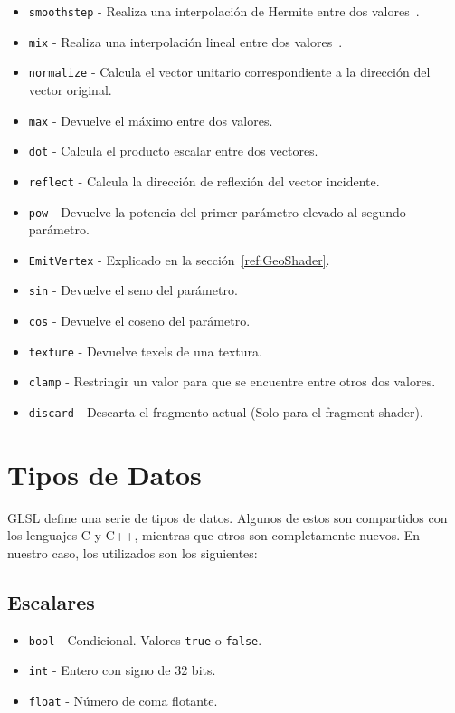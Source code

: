 \begin{itemize}
		\item \verb|smoothstep| - Realiza una interpolación de Hermite entre dos
				valores~\cite{Hermite}.
		\item \verb|mix| - Realiza una interpolación lineal entre dos
				valores~\cite{LinearInterpolation}.
		\item \verb|normalize| - Calcula el vector unitario correspondiente a la
				dirección del vector original.
		\item \verb|max| - Devuelve el máximo entre dos valores.
		\item \verb|dot| - Calcula el producto escalar entre dos vectores.
		\item \verb|reflect| - Calcula la dirección de reflexión del vector
				incidente.
		\item \verb|pow| - Devuelve la potencia del primer parámetro elevado al
				segundo parámetro.
		\item \verb|EmitVertex| - Explicado en la sección~\ref{ref:GeoShader}.
		\item \verb|sin| - Devuelve el seno del parámetro.
		\item \verb|cos| - Devuelve el coseno del parámetro.
		\item \verb|texture| - Devuelve texels de una textura.
		\item \verb|clamp| - Restringir un valor para que se encuentre entre
				otros dos valores.
		\item \verb|discard| - Descarta el fragmento actual (Solo para el
				fragment shader).
\end{itemize}

\section{Tipos de Datos}

GLSL define una serie de tipos de datos. Algunos de estos son compartidos con
los lenguajes C y C++, mientras que otros son completamente nuevos. En nuestro
caso, los utilizados son los siguientes:

\subsection{Escalares}

\begin{itemize}
		\item \verb|bool| - Condicional. Valores \verb|true| o \verb|false|.
		\item \verb|int| - Entero con signo de 32 bits.
		\item \verb|float| - Número de coma flotante.
\end{itemize}

